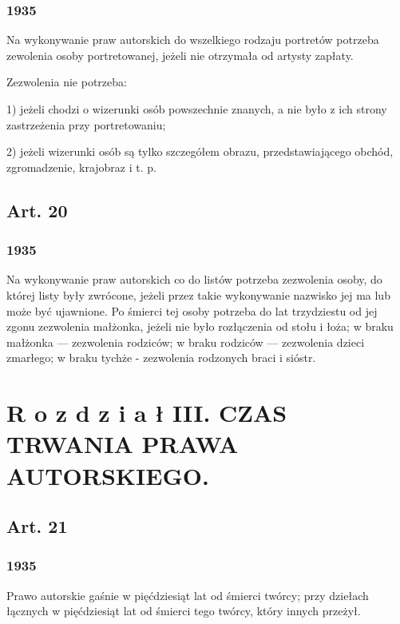 \documentclass[withmarginpar]{book}
\begin{document}
\subsection{1935}
\label{sec:art.-19-1}

Na wykonywanie praw autorskich do wszelkiego rodzaju portretów
potrzeba zewolenia osoby portretowanej, jeżeli nie otrzymała od
artysty zapłaty.

Zezwolenia nie potrzeba:

1) jeżeli chodzi o wizerunki osób powszechnie znanych, a nie było z ich strony zastrzeżenia przy portretowaniu;

2) jeżeli wizerunki osób są tylko szczegółem obrazu, przedstawiającego obchód, zgromadzenie, krajobraz i t. p.

\section{Art. 20}
\label{sec:art.-20}
\subsection{1935}
\label{sec:art.-20-1}

Na wykonywanie praw autorskich co do listów potrzeba zezwolenia osoby,
do której listy były zwrócone, jeżeli przez takie wykonywanie nazwisko
jej ma lub może być ujawnione. Po śmierci tej osoby potrzeba do lat
trzydziestu od jej zgonu zezwolenia małżonka, jeżeli nie było
rozłączenia od stołu i łoża; w braku małżonka — zezwolenia rodziców; w
braku rodziców — zezwolenia dzieci zmarłego; w braku tychże -
zezwolenia rodzonych braci i sióstr.

\chapter{R o z d z i a ł   III.
CZAS TRWANIA PRAWA AUTORSKIEGO.}
\label{cha:r-o-z-1}

\section{Art. 21}
\label{sec:art.-21}
\subsection{1935}
\label{sec:art.-21-1}

Prawo autorskie gaśnie w pięćdziesiąt lat od śmierci twórcy; przy
dziełach łącznych w pięćdziesiąt lat od śmierci tego twórcy, który
innych przeżył.
\end{document}

